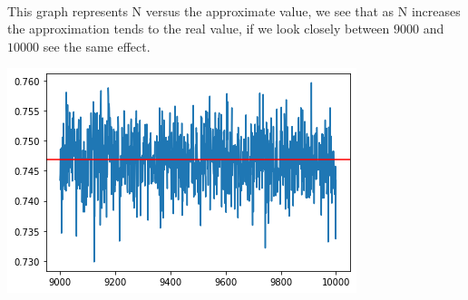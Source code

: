 \documentclass{article}
\begin{document}
\paragraph{} This graph represents N versus the approximate value, we see that as N increases the approximation tends to the real value, if we look closely between $9000$ and $10000$ see the same effect.
\begin{center}
	\includegraphics[width=0.7\linewidth]{error_convergence_closer.png}
\end{center}
\end{document}
